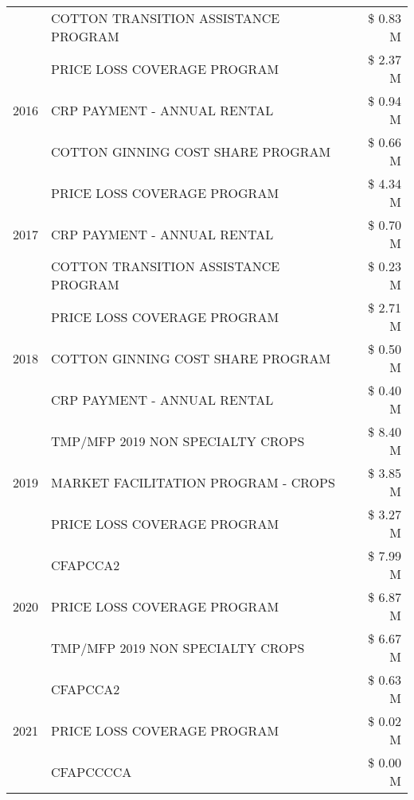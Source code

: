 \begin{tabular}{llr}
 & COTTON TRANSITION ASSISTANCE PROGRAM & \$ 0.83 M \\
\cline{1-3}
\multirow[t]{3}{*}{2016} & PRICE LOSS COVERAGE PROGRAM & \$ 2.37 M \\
 & CRP PAYMENT - ANNUAL RENTAL & \$ 0.94 M \\
 & COTTON GINNING COST SHARE PROGRAM & \$ 0.66 M \\
\cline{1-3}
\multirow[t]{3}{*}{2017} & PRICE LOSS COVERAGE PROGRAM & \$ 4.34 M \\
 & CRP PAYMENT - ANNUAL RENTAL & \$ 0.70 M \\
 & COTTON TRANSITION ASSISTANCE PROGRAM & \$ 0.23 M \\
\cline{1-3}
\multirow[t]{3}{*}{2018} & PRICE LOSS COVERAGE PROGRAM & \$ 2.71 M \\
 & COTTON GINNING COST SHARE PROGRAM & \$ 0.50 M \\
 & CRP PAYMENT - ANNUAL RENTAL & \$ 0.40 M \\
\cline{1-3}
\multirow[t]{3}{*}{2019} & TMP/MFP 2019 NON SPECIALTY CROPS & \$ 8.40 M \\
 & MARKET FACILITATION PROGRAM - CROPS & \$ 3.85 M \\
 & PRICE LOSS COVERAGE PROGRAM & \$ 3.27 M \\
\cline{1-3}
\multirow[t]{3}{*}{2020} & CFAPCCA2 & \$ 7.99 M \\
 & PRICE LOSS COVERAGE PROGRAM & \$ 6.87 M \\
 & TMP/MFP 2019 NON SPECIALTY CROPS & \$ 6.67 M \\
\cline{1-3}
\multirow[t]{3}{*}{2021} & CFAPCCA2 & \$ 0.63 M \\
 & PRICE LOSS COVERAGE PROGRAM & \$ 0.02 M \\
 & CFAPCCCCA & \$ 0.00 M \\
\cline{1-3}
\bottomrule
\end{tabular}
